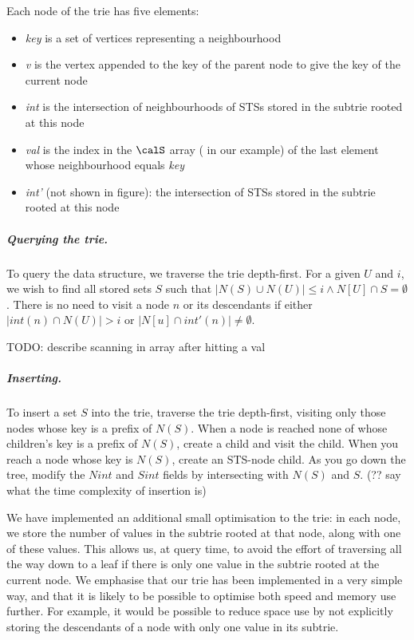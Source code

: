 Each node of the trie has five elements:

\begin{itemize}
  \item \emph{key} is a set of vertices representing a neighbourhood
  \item \emph{v} is the vertex appended to the key of the parent node to give the key of the current node
  \item \emph{int} is the intersection of neighbourhoods of STSs stored in the subtrie rooted at this node
  \item \emph{val} is the index in the $\calS$ array ( in our example) of the
    last element whose neighbourhood equals \emph{key}
  \item \emph{int'} (not shown in figure): the intersection of STSs stored in the subtrie rooted at this node
\end{itemize}

\subparagraph*{Querying the trie.} To query the data structure, we traverse the trie depth-first.
For a given $U$ and $i$, we wish to find all stored sets $S$ such that 
$|N(S) \cup N(U)| \leq i \wedge N[U] \cap S = \emptyset$.  There is
no need to visit a node $n$ or its descendants if either $|int(n) \cap N(U)| > i$
or $|N[u] \cap int'(n)| \not= \emptyset$. 

TODO: describe scanning in array after hitting a val

\subparagraph*{Inserting.} To insert a set $S$ into the trie, traverse the trie
depth-first, visiting only those nodes whose key is a prefix of $N(S)$.
When a node is reached none of whose children's key is a prefix of $N(S)$,
create a child and visit the child.  When you reach a node whose key is $N(S)$,
create an STS-node child.  As you go down the tree, modify the $Nint$ and $Sint$
fields by intersecting with $N(S)$ and $S$.
(?? say what the time complexity of insertion is)

We have implemented an additional small optimisation to the trie: in each node,
we store the number of values in the subtrie rooted at that node, along with
one of these values.  This allows us, at query time, to avoid the effort of traversing
all the way down to a leaf if there is only one value in the subtrie rooted
at the current node.  We emphasise that our trie has been implemented in a very
simple way, and that it is likely to be possible to optimise both speed and memory
use further.  For example, it would be possible to reduce space use by not explicitly storing
the descendants of a node with only one value in its subtrie.

